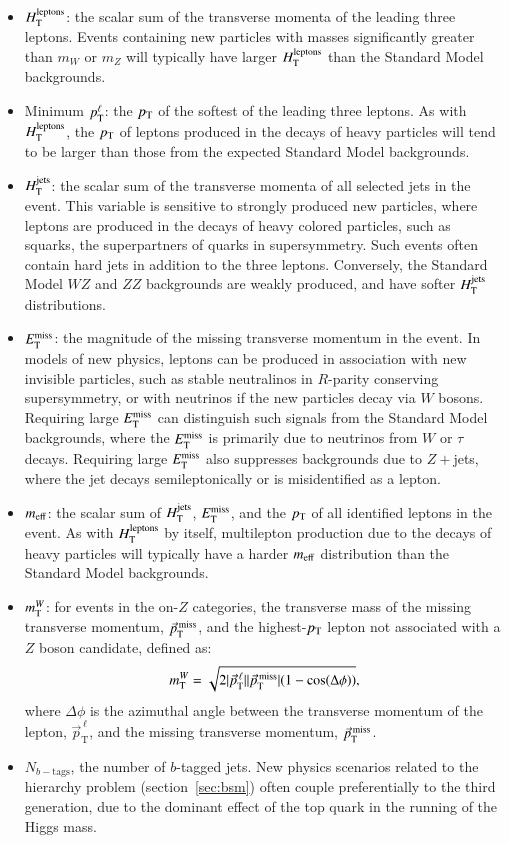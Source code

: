 \begin{itemize}
	\item $H_{\mathrm{T}}^{\mathrm{leptons}}$: the scalar sum of the transverse momenta of the leading three leptons. Events containing new particles with masses significantly greater than $m_W$ or $m_Z$ will typically have larger $H_{\mathrm{T}}^{\mathrm{leptons}}$ than the Standard Model backgrounds.
	\item Minimum $p_{\text{T}}^{\ell}$: the $p_{\text{T}}$ of the softest of the leading three leptons. As with $H_{\mathrm{T}}^{\mathrm{leptons}}$, the $p_{\text{T}}$ of leptons produced in the decays of heavy particles will tend to be larger than those from the expected Standard Model backgrounds.
	\item $H_{\mathrm{T}}^{\mathrm{jets}}$: the scalar sum of the transverse momenta of all selected jets in the event. This variable is sensitive to strongly produced new particles, where leptons are produced in the decays of heavy colored particles, such as squarks, the superpartners of quarks in supersymmetry. Such events often contain hard jets in addition to the three leptons. Conversely, the Standard Model $WZ$ and $ZZ$ backgrounds are weakly produced, and have softer $H_{\mathrm{T}}^{\mathrm{jets}}$ distributions.
	\item $E_{\text{T}}^{\text{miss}}$: the magnitude of the missing transverse momentum in the event. In models of new physics, leptons can be produced in association with new invisible particles, such as stable neutralinos in $R$-parity conserving supersymmetry, or with neutrinos if the new particles decay via $W$ bosons. Requiring large $E_{\text{T}}^{\text{miss}}$ can distinguish such signals from the Standard Model backgrounds, where the $E_{\text{T}}^{\text{miss}}$ is primarily due to neutrinos from $W$ or $\tau$ decays. Requiring large $E_{\text{T}}^{\text{miss}}$ also suppresses backgrounds due to $Z+$jets, where the jet decays semileptonically or is misidentified as a lepton. 
	\item $m_{\mathrm{eff}}$: the scalar sum of $H_{\mathrm{T}}^{\mathrm{jets}}$, $E_{\text{T}}^{\text{miss}}$, and the $p_{\text{T}}$ of all identified leptons in the event. As with $H_{\mathrm{T}}^{\mathrm{leptons}}$ by itself, multilepton production due to the decays of heavy particles will typically have a harder $m_{\mathrm{eff}}$ distribution than the Standard Model backgrounds.
	\item $m_{\mathrm{T}}^W$: for events in the on-$Z$ categories, the transverse mass of the missing transverse momentum, $\vec{p}_{\mathrm{T}}^{\,\mathrm{miss}}$, and the highest-$p_{\text{T}}$ lepton not associated with a $Z$ boson candidate, defined as:
	\begin{equation}
		m_{\mathrm{T}}^W = \sqrt{2 |\vec{p}_{\mathrm{T}}^{\,\ell}||\vec{p}_{\mathrm{T}}^{\,\mathrm{miss}}|(1-\cos(\Delta\phi))},
	\end{equation}
	where $\Delta \phi$ is the azimuthal angle between the transverse momentum of the lepton, $\vec{p}_{\mathrm{T}}^{\,\ell}$, and the missing transverse momentum, $\vec{p}_{\mathrm{T}}^{\,\mathrm{miss}}$. 
	\item $N_{b-\mathrm{tags}}$, the number of $b$-tagged jets. New physics scenarios related to the hierarchy problem (section~\ref{sec:bsm}) often couple preferentially to the third generation, due to the dominant effect of the top quark in the running of the Higgs mass. 
\end{itemize}

